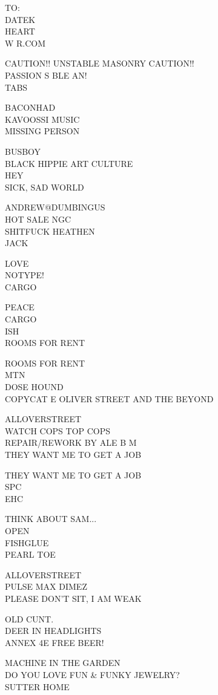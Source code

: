 \documentclass[10pt,letterpaper]{article}
\begin{document}
TO:\\
DATEK\\
HEART\\
W R.COM

CAUTION!! UNSTABLE MASONRY CAUTION!!\\
PASSION S BLE AN!\\
TABS

BACONHAD\\
KAVOOSSI MUSIC\\
MISSING PERSON

BUSBOY\\
BLACK HIPPIE ART CULTURE\\
HEY\\
SICK, SAD WORLD

ANDREW@DUMBINGUS\\
HOT SALE NGC\\
SHITFUCK HEATHEN\\
JACK

LOVE\\
NOTYPE!\\
CARGO

PEACE\\
CARGO\\
ISH\\
ROOMS FOR RENT

ROOMS FOR RENT\\
MTN\\
DOSE HOUND\\
COPYCAT E OLIVER STREET AND THE BEYOND

ALLOVERSTREET\\
WATCH COPS TOP COPS\\
REPAIR/REWORK BY ALE B M\\
THEY WANT ME TO GET A JOB

THEY WANT ME TO GET A JOB\\
SPC\\
EHC

THINK ABOUT SAM...\\
OPEN\\
FISHGLUE\\
PEARL TOE

ALLOVERSTREET\\
PULSE MAX DIMEZ\\
PLEASE DON'T SIT, I AM WEAK

OLD CUNT.\\
DEER IN HEADLIGHTS\\
ANNEX 4E FREE BEER!

MACHINE IN THE GARDEN\\
DO YOU LOVE FUN \& FUNKY JEWELRY?\\
SUTTER HOME
\end{document}
